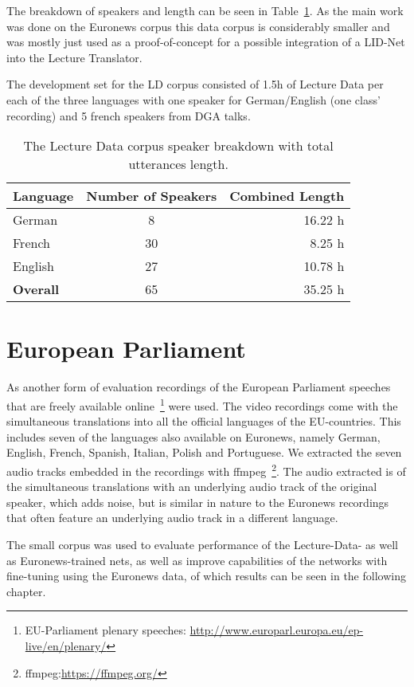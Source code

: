 The breakdown of speakers and length can be seen in Table~\ref{tab:spkDataLD}. As the main work was done on the Euronews corpus this data corpus is considerably smaller and was mostly just used as a proof-of-concept for a possible integration of a LID-Net into the Lecture Translator. 

The development set for the LD corpus consisted of 1.5h of Lecture Data per each of the three languages with one speaker for German/English (one class' recording) and 5 french speakers from DGA talks.
\begin{table}[h!]
\label{tab:spkDataLD}
\centering
\begin{tabular}{| l | c | r | }
	\hline
	\textbf{Language} & \textbf{Number of Speakers} & \textbf{Combined Length} \\
	\hline
	German & 8 &  16.22 h \\
	French & 30 & 8.25 h \\  
	English & 27 & 10.78 h \\ 
	\hline
	\textbf{Overall} & 65 & 35.25 h\\
	\hline
	
\end{tabular}
\caption{The Lecture Data corpus speaker breakdown with total utterances length.}
\end{table}

\section{European Parliament}
\label{sec:LITasks:EU}

As another form of evaluation recordings of the European Parliament speeches that are freely available online~\footnote{EU-Parliament plenary speeches: \url{http://www.europarl.europa.eu/ep-live/en/plenary/}} were used. The video recordings come with the simultaneous translations into all the official languages of the EU-countries.  This includes seven of the languages also available on Euronews, namely German, English, French, Spanish, Italian, Polish and Portuguese. We extracted the seven audio tracks embedded in the recordings with ffmpeg~\footnote{ffmpeg:\url{https://ffmpeg.org/}}. The audio extracted is of the simultaneous translations with an underlying audio track of the original speaker, which adds noise, but is similar in nature to the Euronews recordings that often feature an underlying audio track in a different language.

The small corpus was used to evaluate performance of the Lecture-Data- as well as Euronews-trained nets, as well as improve capabilities of the networks with fine-tuning using the Euronews data, of which results can be seen in the following chapter.

